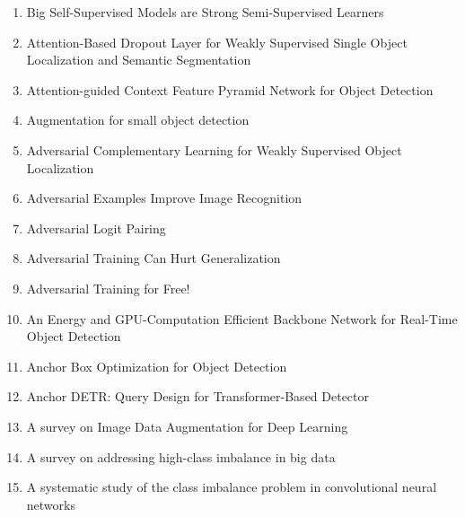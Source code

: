\documentclass[acmlarge]{acmart}
\begin{document}
\begin{enumerate}
	\item Big Self-Supervised Models are Strong Semi-Supervised Learners \cite{Chen2020BigSM} 

	\item Attention-Based Dropout Layer for Weakly Supervised Single Object Localization and Semantic Segmentation \cite{Choe2021AttentionBasedDL} 

	\item Attention-guided Context Feature Pyramid Network for Object Detection \cite{Cao2020AttentionguidedCF} 

	\item Augmentation for small object detection \cite{Kisantal2019AugmentationFS} 

	\item Adversarial Complementary Learning for Weakly Supervised Object Localization \cite{Zhang2018AdversarialCL} 

	\item Adversarial Examples Improve Image Recognition \cite{Xie2020AdversarialEI} 

	\item Adversarial Logit Pairing \cite{Kannan2018AdversarialLP} 

	\item Adversarial Training Can Hurt Generalization \cite{Raghunathan2019AdversarialTC} 

	\item Adversarial Training for Free! \cite{Shafahi2019AdversarialTF} 

	\item An Energy and GPU-Computation Efficient Backbone Network for Real-Time Object Detection \cite{Lee2019AnEA} 

	\item Anchor Box Optimization for Object Detection \cite{Zhong2020AnchorBO} 

	\item Anchor DETR: Query Design for Transformer-Based Detector \cite{Wang2021AnchorDQ} 

	\item A survey on Image Data Augmentation for Deep Learning \cite{Shorten2019ASO} 

	\item A survey on addressing high-class imbalance in big data \cite{Leevy2018ASO} 

	\item A systematic study of the class imbalance problem in convolutional neural networks \cite{Buda2018ASS} 


\end{enumerate}
\end{document}

